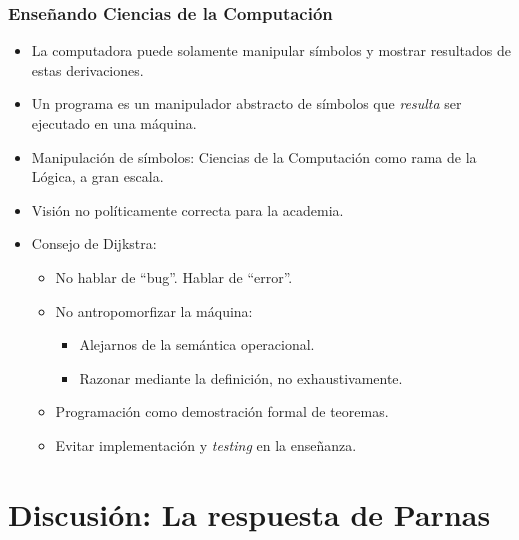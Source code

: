 \documentclass[ignorenonframetext,]{beamer}
\begin{document}
\begin{frame}\frametitle{Enseñando Ciencias de la Computación}

\begin{itemize}[<+->]
\itemsep1pt\parskip0pt
\item
  La computadora puede solamente manipular símbolos y mostrar resultados
  de estas derivaciones.
\item
  Un programa es un manipulador abstracto de símbolos que \emph{resulta}
  ser ejecutado en una máquina.
\item
  Manipulación de símbolos: Ciencias de la Computación como rama de la
  Lógica, a gran escala.
\item
  Visión no políticamente correcta para la academia.
\item
  Consejo de Dijkstra:

  \begin{itemize}[<+->]
  \itemsep1pt\parskip0pt
  \item
    No hablar de ``bug''. Hablar de ``error''.
  \item
    No antropomorfizar la máquina:

    \begin{itemize}[<+->]
    \itemsep1pt\parskip0pt
    \item
      Alejarnos de la semántica operacional.
    \item
      Razonar mediante la definición, no exhaustivamente.
    \end{itemize}
  \item
    Programación como demostración formal de teoremas.
  \item
    Evitar implementación y \emph{testing} en la enseñanza.
  \end{itemize}
\end{itemize}

\end{frame}

\section{Discusión: La respuesta de Parnas}
\end{document}
